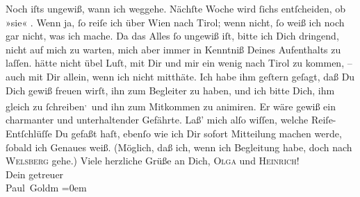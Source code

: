 \begin{ledgroupsized}[t]{13cm}
           \pstart
           Noch iſts ungewiß, wann ich weggehe. Nächſte Woche wird ſichs entſcheiden, ob »sie« \label{K_L03379-2v}\label{K_L03379-2h}. Wenn ja, ſo \strikeout{\textcolor{gray}{k}} reiſe ich über Wien nach Tirol; wenn nicht, ſo weiß ich noch gar nicht, was ich
               mache. Da das Alles ſo ungewiß iſt, bitte ich Dich dringend, nicht auf mich zu
               warten, mich aber immer in Kenntniß Deines Aufenthalts {\pb}zu laſſen.\pend
           \pstart
           \label{K_L03379-3v}\label{K_L03379-3h} hätte nicht übel
               Luſt, mit Dir und mir ein wenig nach Tirol zu kommen, – auch mit Dir allein, wenn ich nicht mitthäte. Ich habe
               ihm geſtern geſagt, daß Du Dich gewiß freuen wirſt,
               ihn zum Begleiter zu haben, und ich bitte Dich, ihm gleich zu ſchreiben\substVorne{}\textsuperscript{,}\substDazwischen{} und\substHinten{} ihn zum Mitkommen zu animiren. Er wäre gewiß ein charmanter und
               unterhaltender Gefährte.\pend
           \pstart
           Laß’ mich alſo wiſſen, {\pb}welche Reiſe-Entſchlüſſe Du
               gefaßt haſt, ebenſo wie ich Dir sofort Mitteilung machen werde, ſobald ich Genaues
               weiß. (Möglich, daß ich, wenn ich Begleitung habe, doch nach \textsc{Welsberg} gehe.)\pend
           \pstart
           Viele herzliche Grüße an Dich, \textsc{Olga} und \textsc{Heinrich}! {\\[\baselineskip]}Dein getreuer {\\[\baselineskip]}\spacefill\mbox{Paul Goldm}\pend
           \leftskip=0em{}
         
         \endnumbering{}\end{ledgroupsized}  \newcommand{\dateiname}{L03379}\newcommand{\titel}{Paul Goldmann an Arthur Schnitzler, 31. 7. [1903]}\newcommand{\editorInnen}{Martin Anton Müller und Laura Untner}
      